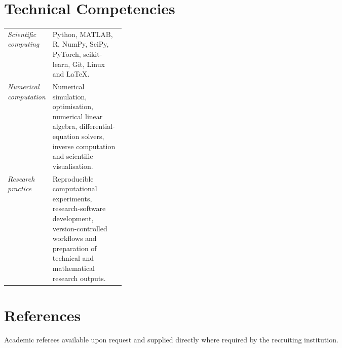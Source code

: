 \documentclass[11pt,a4paper]{article}
\begin{document}
\section{Technical Competencies}

\begin{tabularx}{\linewidth}
{@{}>{\raggedright\arraybackslash}p{0.27\linewidth} X@{}}

\textit{Scientific computing}
&
Python, MATLAB, R, NumPy, SciPy, PyTorch, scikit-learn,
Git, Linux and LaTeX.
\\[3pt]

\textit{Numerical computation}
&
Numerical simulation, optimisation, numerical linear algebra,
differential-equation solvers, inverse computation and
scientific visualisation.
\\[3pt]

\textit{Research practice}
&
Reproducible computational experiments, research-software
development, version-controlled workflows and preparation of
technical and mathematical research outputs.

\end{tabularx}

\section{References}

Academic referees available upon request and supplied directly
where required by the recruiting institution.
\end{document}
